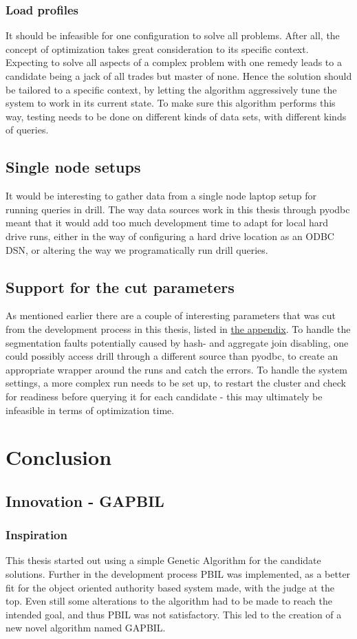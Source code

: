 \documentclass[a4paper,english]{report}
\begin{document}
	\subsection{Load profiles}
	It should be infeasible for one configuration to solve all problems. After all, the concept of optimization takes great consideration to its specific context. Expecting to solve all aspects of a complex problem with one remedy leads to a candidate being a jack of all trades but master of none. Hence the solution should be tailored to a specific context, by letting the algorithm aggressively tune the system to work in its current state. To make sure this algorithm performs this way, testing needs to be done on different kinds of data sets, with different kinds of queries.
	\section{Single node setups}
	It would be interesting to gather data from a single node laptop setup for running queries in drill. The way data sources work in this thesis through pyodbc meant that it would add too much development time to adapt for local hard drive runs, either in the way of configuring a hard drive location as an ODBC DSN, or altering the way we programatically run drill queries. 
	\section{Support for the cut parameters}
	As mentioned earlier there are a couple of interesting parameters that was cut from the development process in this thesis, listed in \hyperref[table:removed_params]{the appendix}. To handle the segmentation faults potentially caused by hash- and aggregate join disabling, one could possibly access drill through a different source than pyodbc, to create an appropriate wrapper around the runs and catch the errors. To handle the system settings, a more complex run needs to be set up, to restart the cluster and check for readiness before querying it for each candidate - this may ultimately be infeasible in terms of optimization time.
	
	\chapter{Conclusion}
	\section{Innovation - GAPBIL}
		\subsection{Inspiration}
		This thesis started out using a simple Genetic Algorithm for the candidate solutions. Further in the development process PBIL was implemented, as a better fit for the object oriented authority based system made, with the judge at the top. Even still some alterations to the algorithm had to be made to reach the intended goal, and thus PBIL was not satisfactory. This led to the creation of a new novel algorithm named GAPBIL.
\end{document}
